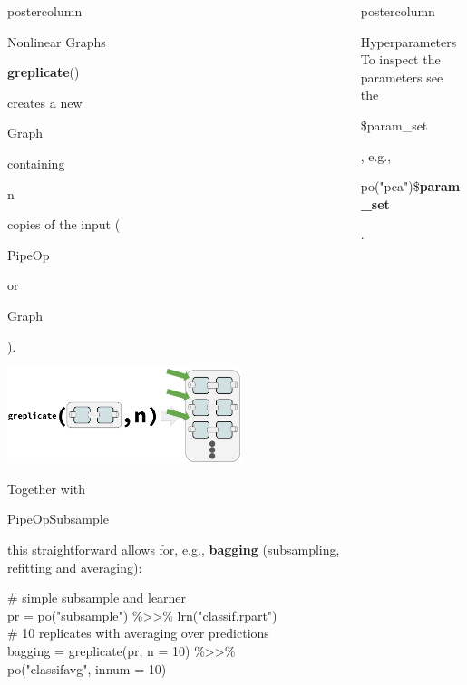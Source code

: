 \documentclass{beamer}
\newlength{\columnheight} %
\newcommand{\codeinline}[1]{\begin{codeboxinline}#1\end{codeboxinline}}
\begin{document}
\begin{frame}[fragile]{}
\begin{columns}
\begin{column}{.245\textwidth}
\begin{beamercolorbox}[center]{postercolumn}
\begin{minipage}{.98\textwidth}
{\begin{myblock}{Nonlinear Graphs}
              \ \\
              \codeinline{\textbf{greplicate}()} creates a new \codeinline{Graph} containing \codeinline{n} copies of the input (\codeinline{PipeOp} or \codeinline{Graph}).
              \begin{center}
                \includegraphics[width=0.7\textwidth]{img/greplicate.pdf}
              \end{center}
              Together with \codeinline{PipeOpSubsample} this straightforward allows for, e.g., \textbf{bagging} (subsampling, refitting and averaging):
              \begin{codeboxexample}
						    {\footnotesize
                  \# simple subsample and learner\\
                  pr = po("subsample") \%>{}>\% lrn("classif.rpart")\\
                  \# 10 replicates with averaging over predictions\\
                  bagging = greplicate(pr, n = 10) \%>{}>\%\\
                  \hspace*{1ex} po("classifavg", innum = 10)}
					    \end{codeboxexample}
            \end{myblock}
						\vfill}
				\end{minipage}
			\end{beamercolorbox}
		\end{column}
    \begin{column}{.245\textwidth}
			\begin{beamercolorbox}[center]{postercolumn}
				\begin{minipage}{.98\textwidth}
					\parbox[t][\columnheight]{\textwidth}{
            \begin{myblock}{Hyperparameters}
              To inspect the parameters see the \codeinline{\$param\_set}, e.g., \codeinline{po("pca")\$\textbf{param\_set}}.\\

\end{myblock}}
\end{minipage}
\end{beamercolorbox}
\end{column}
\end{columns}
\end{frame}
\end{document}
